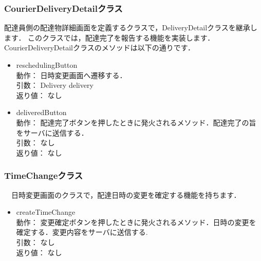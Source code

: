 \documentclass[a4j,titlepage]{jarticle}
\begin{document}
\subsubsection{CourierDeliveryDetailクラス}
配達員側の配達物詳細画面を定義するクラスで，DeliveryDetailクラスを継承します．
このクラスでは，配達完了を報告する機能を実装します．
CourierDeliveryDetailクラスのメソッドは以下の通りです．
\begin{itemize}
\item reschedulingButton\\
 動作： 日時変更画面へ遷移する．\\
 引数： Delivery delivery\\
 返り値： なし

\item deliveredButton\\
 動作： 配達完了ボタンを押したときに発火されるメソッド．配達完了の旨をサーバに送信する．\\
 引数： なし\\
 返り値： なし
\end{itemize}

\subsubsection{TimeChangeクラス}
　日時変更画面のクラスで，配達日時の変更を確定する機能を持ちます．
\begin{itemize}
 \item createTimeChange\\
   動作： 変更確定ボタンを押したときに発火されるメソッド．日時の変更を確定する．変更内容をサーバに送信する.\\
 引数： なし\\
 返り値： なし
\end{itemize}
\end{document}
